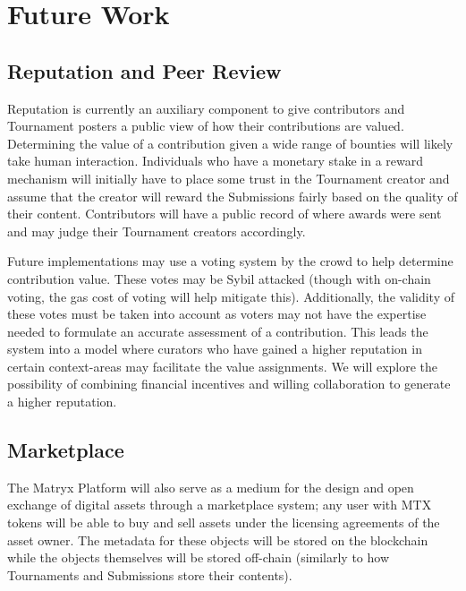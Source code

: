 \documentclass[a4paper, 10pt, conference]{ieeeconf}      %
\begin{document}
\section{Future Work}\label{futurework}
\subsection{Reputation and Peer Review}\label{reputationandpeerreview}
Reputation is currently an auxiliary component to give contributors and Tournament posters a public view of how their contributions are valued.
Determining the value of a contribution given a wide range of bounties will likely take human interaction.
Individuals who have a monetary stake in a reward mechanism will initially have to place some trust in the Tournament creator and assume that the creator will reward the Submissions fairly based on the quality of their content. 
Contributors will have a public record of where awards were sent and may judge their Tournament creators accordingly.

Future implementations may use a voting system by the crowd to help determine contribution value.
These votes may be Sybil attacked (though with on-chain voting, the gas cost of voting will help mitigate this). 
Additionally, the validity of these votes must be taken into account as voters may not have the expertise needed to formulate an accurate assessment of a contribution. This leads the system into a model where curators who have gained a higher reputation in certain context-areas may facilitate the value assignments. 
We will explore the possibility of combining financial incentives and willing collaboration to generate a higher reputation.

\subsection{Marketplace}\label{marketplace}
The Matryx Platform will also serve as a medium for the design and open exchange of digital assets through a marketplace system; any user with MTX tokens will be able to buy and sell assets under the licensing agreements of the asset owner. 
The metadata for these objects will be stored on the blockchain while the objects themselves will be stored off-chain (similarly to how Tournaments and Submissions store their contents).

\end{document}
